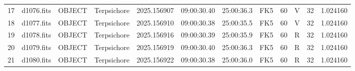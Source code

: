 \begin{tabular}{llllrlllllll}
17 & d1076.fits & OBJECT & Terpsichore & 2025.156907 & 09:00:30.40 & 25:00:36.3 & FK5 & 60 & V & 32 & 1.024160 \\
18 & d1077.fits & OBJECT & Terpsichore & 2025.156910 & 09:00:30.38 & 25:00:35.5 & FK5 & 60 & V & 32 & 1.024160 \\
19 & d1078.fits & OBJECT & Terpsichore & 2025.156916 & 09:00:30.39 & 25:00:35.9 & FK5 & 60 & R & 32 & 1.024160 \\
20 & d1079.fits & OBJECT & Terpsichore & 2025.156919 & 09:00:30.40 & 25:00:36.3 & FK5 & 60 & R & 32 & 1.024160 \\
21 & d1080.fits & OBJECT & Terpsichore & 2025.156922 & 09:00:30.38 & 25:00:36.0 & FK5 & 60 & R & 32 & 1.024160 \\
\end{tabular}
